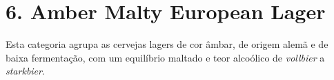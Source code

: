 \section*{6. Amber Malty European Lager}

Esta categoria agrupa as cervejas lagers de cor âmbar, de origem alemã e de baixa fermentação, com um equilíbrio maltado e teor alcoólico de \textit{vollbier} a \textit{starkbier}.
